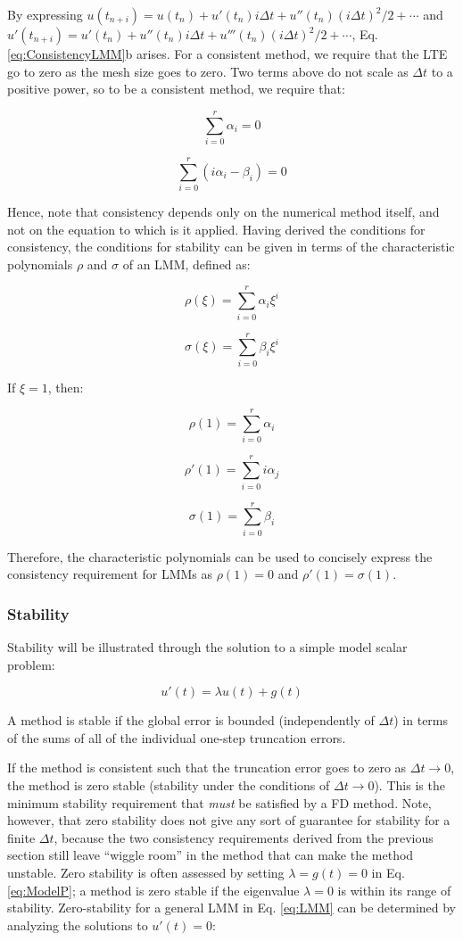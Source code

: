 \documentclass[10pt]{article}
\newcommand{\beq}{\begin{equation}}
\newcommand{\eeq}{\end{equation}}
\newcounter{subsubsubsection}[subsubsection]
\begin{document}
\begin{flushleft}
By expressing \(u(t_{n+i})=u(t_n)+u'(t_n)i\Delta t+u''(t_n)(i\Delta t)^2/2+\cdots\) and \(u'(t_{n+i})=u'(t_n)+u''(t_n)i\Delta t+u'''(t_n)(i\Delta t)^2/2+\cdots\), Eq. \eqref{eq:ConsistencyLMM}b arises. For a consistent method, we require that the LTE go to zero as the mesh size goes to zero. Two terms above do not scale as \(\Delta t\) to a positive power, so to be a consistent method, we require that:

\beq
\sum_{i=0}^r\alpha_i=0
\eeq

\beq
\sum_{i=0}^r(i\alpha_i-\beta_i)=0
\eeq

Hence, note that consistency depends only on the numerical method itself, and not on the equation to which is it applied. Having derived the conditions for consistency, the conditions for stability can be given in terms of the characteristic polynomials \(\rho\) and \(\sigma\) of an LMM, defined as:

\beq
\rho(\xi)=\sum_{i=0}^r\alpha_i\xi^i
\eeq

\beq
\sigma(\xi)=\sum_{i=0}^r\beta_i\xi^i
\eeq

\begin{tcolorbox}[breakable]
If \(\xi=1\), then:

\beq
\rho(1)=\sum_{i=0}^r\alpha_i
\eeq

\beq
\rho'(1)=\sum_{i=0}^ri\alpha_j
\eeq

\beq
\sigma(1)=\sum_{i=0}^r\beta_i
\eeq

Therefore, the characteristic polynomials can be used to concisely express the consistency requirement for LMMs as \(\rho(1)=0\) and \(\rho'(1)=\sigma(1)\).
\end{tcolorbox}

\subsubsection{Stability}
Stability will be illustrated through the solution to a simple model scalar problem:

\beq
\label{eq:ModelP}
u'(t)=\lambda u(t)+g(t)
\eeq

A method is stable if the global error is bounded (independently of \(\Delta t\)) in terms of the sums of all of the individual one-step truncation errors. 

If the method is consistent such that the truncation error goes to zero as \(\Delta t\rightarrow0\), the method is zero stable (stability under the conditions of \(\Delta t\rightarrow0\)). This is the minimum stability requirement that {\it must} be satisfied by a FD method. Note, however, that zero stability does not give any sort of guarantee for stability for a finite \(\Delta t\), because the two consistency requirements derived from the previous section still leave ``wiggle room'' in the method that can make the method unstable. Zero stability is often assessed by setting \(\lambda=g(t)=0\) in Eq. \eqref{eq:ModelP}; a method is zero stable if the eigenvalue \(\lambda=0\) is within its range of stability. Zero-stability for a general LMM in Eq. \eqref{eq:LMM} can be determined by analyzing the solutions to \(u'(t)=0\):


\end{flushleft}
\end{document}

